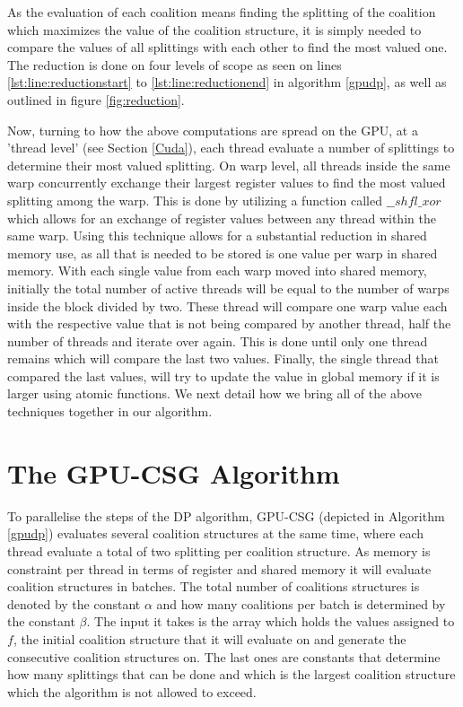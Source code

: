 \documentclass{llncs}
\begin{document}
As the evaluation of each coalition  means finding the splitting  of the coalition  which maximizes the value of the coalition structure, it is simply needed to compare the values of all splittings with each other to find the most valued one.  The reduction is done on four levels of scope as seen on lines \ref{lst:line:reductionstart} to \ref{lst:line:reductionend} in algorithm \ref{gpudp},
as well as outlined in figure \ref{fig:reduction}.

Now, turning to how the above computations are spread on the GPU, at a 'thread level' (see Section \ref{Cuda}), each thread evaluate a number of splittings to determine their most valued splitting.  On warp level, all threads inside the same warp concurrently exchange their largest register values to find the most valued splitting among the warp. This is done by utilizing a function called $\_\_shfl\_xor$ which allows for an exchange of register values between any thread within the same warp.
Using this technique allows for a substantial reduction in shared memory use, as all that is needed to be stored is one value per warp in shared memory.  With each single value from each warp moved into shared memory, initially the total number of active threads will be equal to the number
of warps inside the block divided by two. These thread will compare one warp value each with the respective value that is not being compared by another thread, half the number of threads and iterate over again. This is done until only one thread remains which will compare the last two values.
Finally, the single thread that compared the last values, will try to update the value in global memory if it is larger using atomic functions. We next detail how we bring all of the above techniques together in our algorithm.

\section{The GPU-CSG Algorithm}\label{algorithm}
To parallelise the steps of the DP algorithm, GPU-CSG (depicted in Algorithm \ref{gpudp}) evaluates several coalition structures at the same time, where each thread evaluate a total of two splitting per coalition structure.  As memory is constraint per thread in terms of register and shared memory it will evaluate  coalition structures in batches. The total number of coalitions structures is denoted by the constant $\alpha$  and how many coalitions per batch is determined by the constant $\beta$. The input it takes is the array which holds the values assigned to $f$, the initial coalition structure that it will evaluate on and generate the consecutive coalition structures on. The last ones are constants that determine how many splittings that can be done  and which is the largest coalition structure which the algorithm is not allowed to exceed.
\end{document}
